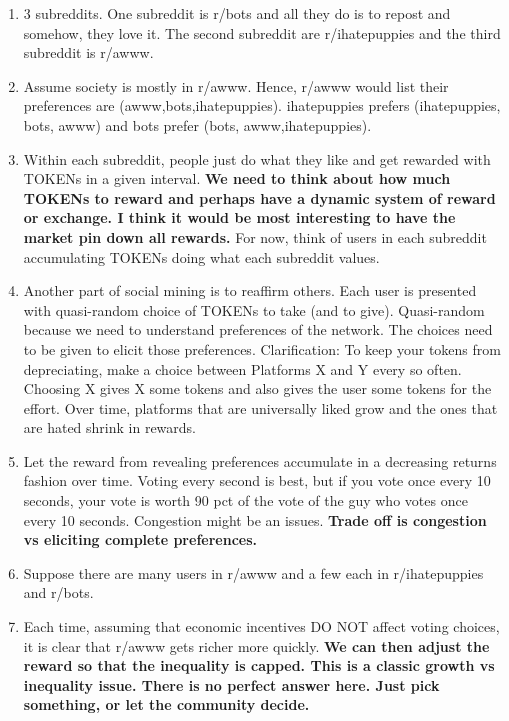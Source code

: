 \documentclass[12pt]{article}
\begin{document}
\begin{enumerate}
	\item 3 subreddits. One subreddit is r/bots and all they do is to repost and somehow, they love it. The second subreddit are r/ihatepuppies and the third subreddit is r/awww.
	
	\item Assume society is mostly in r/awww. Hence, r/awww would list their preferences are (awww,bots,ihatepuppies). ihatepuppies prefers (ihatepuppies, bots, awww) and bots prefer (bots, awww,ihatepuppies).
	
	\item Within each subreddit, people just do what they like and get rewarded with TOKENs in a given interval. \textbf{We need to think about how much TOKENs to reward and perhaps have a dynamic system of reward or exchange. I think it would be most interesting to have the market pin down all rewards.} For now, think of users in each subreddit accumulating TOKENs doing what each subreddit values.
	
	\item Another part of social mining is to reaffirm others. Each user is presented with quasi-random choice of TOKENs to take (and to give). Quasi-random because we need to understand preferences of the network. The choices need to be given to elicit those preferences. Clarification: To keep your tokens from depreciating, make a choice between Platforms X and Y every so often. Choosing X gives X some tokens and also gives the user some tokens for the effort. Over time, platforms that are universally liked grow and the ones that are hated shrink in rewards.
	
	\item Let the reward from revealing preferences accumulate in a decreasing returns fashion over time. Voting every second is best, but if you vote once every 10 seconds, your vote is worth 90 pct of the vote of the guy who votes once every 10 seconds. Congestion might be an issues. \textbf{Trade off is congestion vs eliciting complete preferences.}
	
	\item Suppose there are many users in r/awww and a few each in r/ihatepuppies and r/bots.
	
	\item Each time, assuming that economic incentives DO NOT affect voting choices, it is clear that r/awww gets richer more quickly. \textbf{We can then adjust the reward so that the inequality is capped. This is a classic growth vs inequality issue. There is no perfect answer here. Just pick something, or let the community decide.}
	
\end{enumerate}
\end{document}

